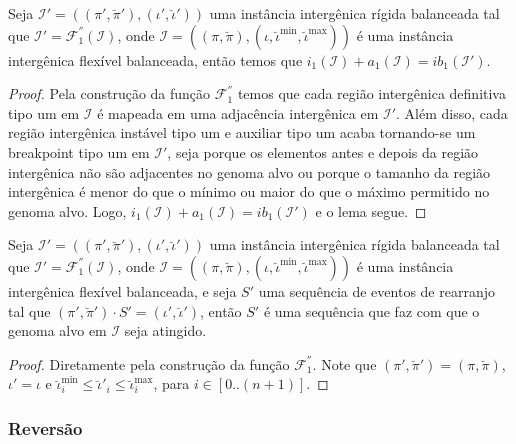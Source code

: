\begin{lemma}\label{lemma:KPGCUTDM}
Seja $\mathcal{I'} = ((\pi',\breve\pi'),(\iota',\breve\iota'))$ uma instância intergênica rígida balanceada tal que $\mathcal{I'} = \mathcal{F}_{1}^{''}(\mathcal{I})$, onde $\mathcal{I} = ((\pi,\breve\pi),(\iota,\breve\iota^{\min},\breve\iota^{\max}))$ é uma instância intergênica flexível balanceada, então temos que $i_1(\mathcal{I}) + a_1(\mathcal{I}) = ib_1(\mathcal{I'})$.
\end{lemma}
\begin{proof}
Pela construção da função $\mathcal{F}_{1}^{''}$ temos que cada região intergênica definitiva tipo um em $\mathcal{I}$ é mapeada em uma adjacência intergênica em $\mathcal{I'}$. Além disso, cada região intergênica instável tipo um e auxiliar tipo um acaba tornando-se um breakpoint tipo um em $\mathcal{I'}$, seja porque os elementos antes e depois da região intergênica não são adjacentes no genoma alvo ou porque o tamanho da região intergênica é menor do que o mínimo ou maior do que o máximo permitido no genoma alvo. Logo, $i_1(\mathcal{I}) + a_1(\mathcal{I}) = ib_1(\mathcal{I'})$ e o lema segue.
\end{proof}

\begin{lemma}\label{lemma:KIVEWTOR}
Seja $\mathcal{I'} = ((\pi',\breve\pi'),(\iota',\breve\iota'))$ uma instância intergênica rígida balanceada tal que $\mathcal{I'} = \mathcal{F}_{1}^{''}(\mathcal{I})$, onde $\mathcal{I} = ((\pi,\breve\pi),(\iota,\breve\iota^{\min},\breve\iota^{\max}))$ é uma instância intergênica flexível balanceada, e seja $S'$ uma sequência de eventos de rearranjo tal que $(\pi',\breve\pi') \cdot S' = (\iota',\breve\iota')$, então $S'$ é uma sequência que faz com que o genoma alvo em $\mathcal{I}$ seja atingido.
\end{lemma}
\begin{proof}
Diretamente pela construção da função $\mathcal{F}_{1}^{''}$. Note que $(\pi',\breve\pi') = (\pi,\breve\pi)$, $\iota' = \iota$ e $\breve\iota^{\min}_i \le \breve\iota'_i \le \breve\iota^{\max}_i$, para $i \in [0..({n+1})]$.
\end{proof}

\subsubsection{Reversão}

